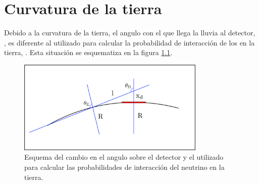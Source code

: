 \chapter{Curvatura de la tierra}
\label{ap:tierraCurva}

	
	Debido a la curvatura de la tierra, el angulo con el que llega la lluvia al detector, \td{}, es diferente al utilizado para calcular la probabilidad de interacci\'on de los \nutau{} en la tierra, \te{}.
	Esta situaci\'on se esquematiza en la figura \ref{fig:curveEarthSketch}.
	
	\begin{figure}[ht!]
		\centering
		\includegraphics[width=0.8\textwidth]{./fig/appendix/curveEarthSketch.png}
		\caption{\label{fig:curveEarthSketch}
		Esquema del cambio en el angulo sobre el detector y el utilizado para calcular las probabilidades de interacci\'on del neutrino en la tierra.
		}
	\end{figure}
	
